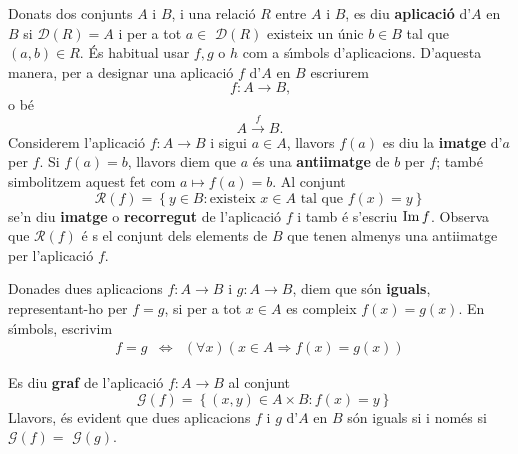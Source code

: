 Donats dos conjunts $A$ i $B$, i una relaci\'{o} $R$ entre $A$ i $B$, es diu
\textbf{aplicaci\'{o}} d'$A$ en $B$ si $\mathcal{D}\left( R\right) =A$ i per
a tot $a\in$ $\mathcal{D}\left( R\right) $ existeix un \'{u}nic $b\in B$ tal
que $(a,b)\in R$. \'{E}s habitual usar $f,g$ o $h$ com a s\'{\i}mbols
d'aplicacions. D'aquesta manera, per a designar una aplicaci\'{o} $f$ d'$A$
en $B$ escriurem%
\begin{equation*}
f:A\longrightarrow B\text{,}
\end{equation*}
o b\'{e}%
\begin{equation*}
A\overset{f}{\longrightarrow}B\text{.}
\end{equation*}
Considerem l'aplicaci\'{o} $f:A\longrightarrow B$ i sigui $a\in A$, llavors $%
f(a)$ es diu la \textbf{imatge} d'$a$ per $f$. Si $f(a)=b$, llavors diem que
$a$ \'{e}s una \textbf{antiimatge} de $b$ per $f$; tamb\'{e} simbolitzem
aquest fet com $a\longmapsto f(a)=b$. Al conjunt%
\begin{equation*}
\mathcal{R}\left( f\right) =\left\{ y\in B:\text{existeix }x\in A\text{ tal
que }f(x)=y\right\}
\end{equation*}
se'n diu \textbf{imatge} o \textbf{recorregut} de l'aplicaci\'{o} $f$ i tamb%
\'{e} s'escriu $\mathop{\rm Im}\nolimits f$. Observa que $\mathcal{R}\left( f\right) $ \'{e}%
s el conjunt dels elements de $B$ que tenen almenys una antiimatge per
l'aplicaci\'{o} $f$.

\bigskip

Donades dues aplicacions $f:A\longrightarrow B$ i $g:A\longrightarrow B$,
diem que s\'{o}n \textbf{iguals}, representant-ho per $f=g$, si per a tot $%
x\in A$ es compleix $f(x)=g(x)$. En s\'{\i}mbols, escrivim%
\begin{equation*}
\begin{array}{ccc}
f=g & \Longleftrightarrow & \left( \forall x\right) \left( x\in
A\Longrightarrow f(x)=g(x)\right)%
\end{array}
\end{equation*}

\bigskip

Es diu \textbf{graf} de l'aplicaci\'{o} $f:A\longrightarrow B$ al conjunt%
\begin{equation*}
\text{ }\mathcal{G}\left( f\right) =\left\{ (x,y)\in A\times
B:f(x)=y\right\}
\end{equation*}
Llavors, \'{e}s evident que dues aplicacions $f$ i $g$ d'$A$ en $B$ s\'{o}n
iguals si i nom\'{e}s si $\mathcal{G}\left( f\right) =$ $\mathcal{G}\left(
g\right) $.

